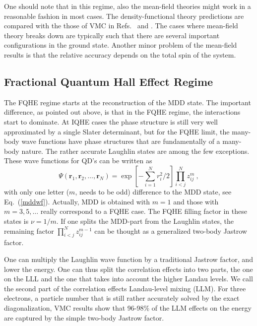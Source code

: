 \documentclass{article}
\begin{document}
One should note that in this regime, also the mean-field theories
might work in a reasonable fashion in most cases. The
density-functional theory predictions are compared with the those of
VMC in Refs.~ and . The cases
where mean-field theory breaks down are typically such that there are
several important configurations in the ground state. Another minor
problem of the mean-field results is that the relative accuracy
depends on the total spin of the system\cite{testDFT}.

\subsection{Fractional Quantum Hall Effect Regime}

The FQHE regime starts at the reconstruction of the MDD state. The
important difference, as pointed out above, is that in the FQHE
regime, the interactions start to dominate. At IQHE cases the phase
structure is still very well approximated by a single Slater
determinant, but for the FQHE limit, the many-body wave functions have
phase structures that are fundamentally of a many-body nature.  The
rather accurate Laughlin states are among the few
exceptions\cite{Laughlin_13}. These wave functions for QD's can be
written as
\begin{equation}
\Psi(\mathbf{r}_1,\mathbf{r}_2,\dots,\mathbf{r}_N) =
\exp\left[-\sum_{i=1}^N r_i^2/2\right] \prod_{i<j}^N z_{ij}^m \ ,
\end{equation}
with only one letter ($m$, needs to be odd) difference to the MDD
state, see Eq.~(\ref{mddwf}). Actually, MDD is obtained with $m=1$ and
those with $m=3,5,\dots$ really correspond to a FQHE case. The FQHE
filling factor in these states is $\nu=1/m$. If one splits the
MDD-part from the Laughlin states, the remaining factor $\prod_{i<j}^N
z_{ij}^{m-1} $ can be thought as a generalized two-body Jastrow
factor.

One can multiply the Laughlin wave function by a traditional Jastrow
factor, and lower the energy. One can thus split the correlation
effects into two parts, the one on the LLL and the one that takes into
account the higher Landau levels. We call the second part of
the correlation effects Landau-level mixing (LLM).  For three
electrons, a particle number that is still rather accurately solved by
the exact diagonalization, VMC results show that 96-98\% of the LLM
effects on the energy are captured by the simple two-body Jastrow
factor\cite{epl}.
\end{document}
